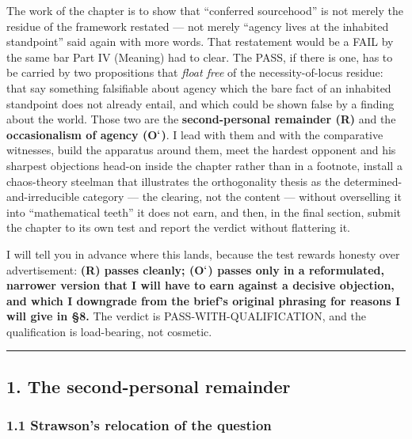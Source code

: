 \documentclass[11pt]{article}
\begin{document}
The work of the chapter is to show that ``conferred sourcehood'' is not merely the residue of the framework restated — not merely ``agency lives at the inhabited standpoint'' said again with more words. That restatement would be a FAIL by the same bar Part IV (Meaning) had to clear. The PASS, if there is one, has to be carried by two propositions that \emph{float free} of the necessity-of-locus residue: that say something falsifiable about agency which the bare fact of an inhabited standpoint does not already entail, and which could be shown false by a finding about the world. Those two are the \textbf{second-personal remainder (R)} and the \textbf{occasionalism of agency (O\ensuremath{`})}. I lead with them and with the comparative witnesses, build the apparatus around them, meet the hardest opponent and his sharpest objections head-on inside the chapter rather than in a footnote, install a chaos-theory steelman that illustrates the orthogonality thesis as the determined-and-irreducible category — the clearing, not the content — without overselling it into ``mathematical teeth'' it does not earn, and then, in the final section, submit the chapter to its own test and report the verdict without flattering it.

I will tell you in advance where this lands, because the test rewards honesty over advertisement: \textbf{(R) passes cleanly; (O\ensuremath{`}) passes only in a reformulated, narrower version that I will have to earn against a decisive objection, and which I downgrade from the brief's original phrasing for reasons I will give in §8.} The verdict is PASS-WITH-QUALIFICATION, and the qualification is load-bearing, not cosmetic.

\medskip\noindent\rule{\linewidth}{0.3pt}\medskip

\subsection*{1. The second-personal remainder}

\subsubsection*{1.1 Strawson's relocation of the question}
\end{document}
